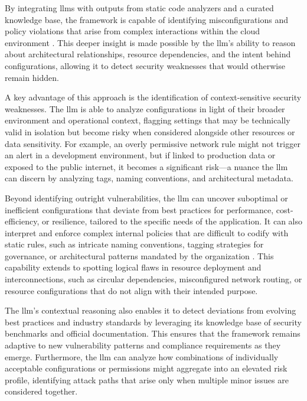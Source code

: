 By integrating \glspl{llm} with outputs from static code analyzers and a curated knowledge base, the framework is capable of identifying misconfigurations and policy violations that arise from complex interactions within the cloud environment \cite{noauthor_evaluating_2024}. This deeper insight is made possible by the \gls{llm}'s ability to reason about architectural relationships, resource dependencies, and the intent behind configurations, allowing it to detect security weaknesses that would otherwise remain hidden.

A key advantage of this approach is the identification of context-sensitive security weaknesses. The \gls{llm} is able to analyze configurations in light of their broader environment and operational context, flagging settings that may be technically valid in isolation but become risky when considered alongside other resources or data sensitivity. For example, an overly permissive network rule might not trigger an alert in a development environment, but if linked to production data or exposed to the public internet, it becomes a significant risk—a nuance the \gls{llm} can discern by analyzing tags, naming conventions, and architectural metadata.

Beyond identifying outright vulnerabilities, the \gls{llm} can uncover suboptimal or inefficient configurations that deviate from best practices for performance, cost-efficiency, or resilience, tailored to the specific needs of the application. It can also interpret and enforce complex internal policies that are difficult to codify with static rules, such as intricate naming conventions, tagging strategies for governance, or architectural patterns mandated by the organization \cite{li_iris_2025}. This capability extends to spotting logical flaws in resource deployment and interconnections, such as circular dependencies, misconfigured network routing, or resource configurations that do not align with their intended purpose.

The \gls{llm}’s contextual reasoning also enables it to detect deviations from evolving best practices and industry standards by leveraging its knowledge base of security benchmarks and official documentation. This ensures that the framework remains adaptive to new vulnerability patterns and compliance requirements as they emerge. Furthermore, the \gls{llm} can analyze how combinations of individually acceptable configurations or permissions might aggregate into an elevated risk profile, identifying attack paths that arise only when multiple minor issues are considered together.

